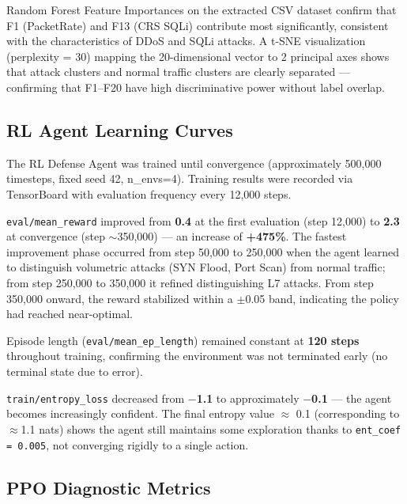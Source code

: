 \documentclass[12pt,a4paper]{report}
\begin{document}
Random Forest Feature Importances on the extracted CSV dataset confirm that F1 (PacketRate) and F13 (CRS SQLi) contribute most significantly, consistent with the characteristics of DDoS and SQLi attacks. A t-SNE visualization (perplexity = 30) mapping the 20-dimensional vector to 2 principal axes shows that attack clusters and normal traffic clusters are clearly separated --- confirming that F1--F20 have high discriminative power without label overlap.

\subsection{RL Agent Learning Curves}

The RL Defense Agent was trained until convergence (approximately 500,000 timesteps, fixed seed 42, n\_envs=4). Training results were recorded via TensorBoard with evaluation frequency every 12,000 steps.

\texttt{eval/mean\_reward} improved from \textbf{0.4} at the first evaluation (step 12,000) to \textbf{2.3} at convergence (step $\sim$350,000) --- an increase of \textbf{+475\%}. The fastest improvement phase occurred from step 50,000 to 250,000 when the agent learned to distinguish volumetric attacks (SYN Flood, Port Scan) from normal traffic; from step 250,000 to 350,000 it refined distinguishing L7 attacks. From step 350,000 onward, the reward stabilized within a $\pm$0.05 band, indicating the policy had reached near-optimal.

Episode length (\texttt{eval/mean\_ep\_length}) remained constant at \textbf{120 steps} throughout training, confirming the environment was not terminated early (no terminal state due to error).

\texttt{train/entropy\_loss} decreased from \textbf{$-$1.1} to approximately \textbf{$-$0.1} --- the agent becomes increasingly confident. The final entropy value $\approx$ 0.1 (corresponding to $\approx$1.1 nats) shows the agent still maintains some exploration thanks to \texttt{ent\_coef = 0.005}, not converging rigidly to a single action.

\subsection{PPO Diagnostic Metrics}
\end{document}

